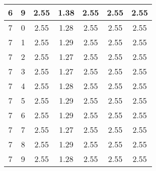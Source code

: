 \begin{longtable}{|c|c||c||c|c||c|c|}
	6 & 9 & 2.55 & 1.38 & 2.55 & 2.55 & 2.55 \\ \hline
	7 & 0 & 2.55 & 1.28 & 2.55 & 2.55 & 2.55 \\ \hline
	7 & 1 & 2.55 & 1.29 & 2.55 & 2.55 & 2.55 \\ \hline
	7 & 2 & 2.55 & 1.27 & 2.55 & 2.55 & 2.55 \\ \hline
	7 & 3 & 2.55 & 1.27 & 2.55 & 2.55 & 2.55 \\ \hline
	7 & 4 & 2.55 & 1.28 & 2.55 & 2.55 & 2.55 \\ \hline
	7 & 5 & 2.55 & 1.29 & 2.55 & 2.55 & 2.55 \\ \hline
	7 & 6 & 2.55 & 1.29 & 2.55 & 2.55 & 2.55 \\ \hline
	7 & 7 & 2.55 & 1.27 & 2.55 & 2.55 & 2.55 \\ \hline
	7 & 8 & 2.55 & 1.29 & 2.55 & 2.55 & 2.55 \\ \hline
	7 & 9 & 2.55 & 1.28 & 2.55 & 2.55 & 2.55 \\ \hline
\end{longtable}
\clearpage{}
